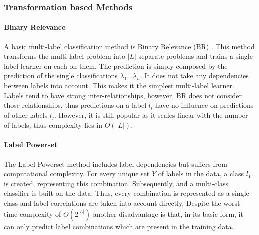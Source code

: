 				\subsubsection{Transformation based Methods}
				\label{subsubsec:transformation}
					\paragraph{Binary Relevance}
					\label{para:br}
						A basic multi-label classification method is Binary Relevance (BR) \cite{Tsoumakas07}. This method transforms the multi-label problem into $ |L| $ separate problems and trains a single-label learner on each on them. The prediction is simply composed by the prediction of the single classifications $ \lambda_1\hdots \lambda_n $. It does not take any dependencies between labels into account. This makes it the simplest multi-label learner. Labels tend to have strong inter-relationships, however, BR does not consider those relationships, thus predictions on a label $ l_i $ have no influence on predictions of other labels $ l_j $. However, it is still popular as it scales linear with the number of labels, thus complexity lies in $ O(|L|) $.
						
					\paragraph{Label Powerset}
					\label{para:lp}
						The Label Powerset method includes label dependencies but suffers from computational complexity. For every unique set $ Y $ of labels in the data, a class $ l_Y $ is created, representing this combination. Subsequently, and a multi-class classifier is built on the data. Thus, every combination is represented as a single class and label correlations are taken into account directly. Despite the worst-time complexity of $ O(2^{|L|}) $ another disadvantage is that, in its basic form, it can only predict label combinations which are present in the training data.
					
